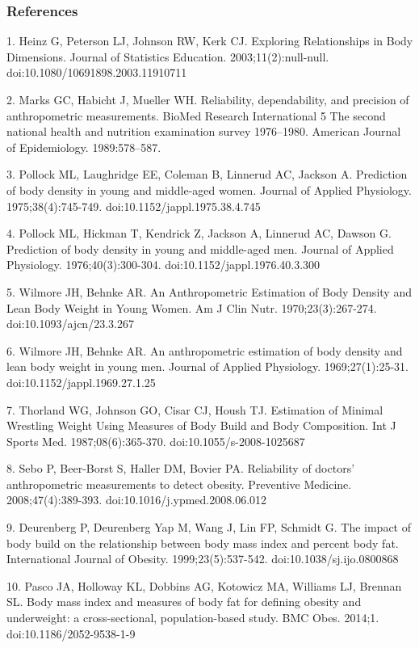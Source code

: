 \documentclass{beamer}
\begin{document}
\begingroup
\small
\begin{frame}
\frametitle{References}
1. Heinz G, Peterson LJ, Johnson RW, Kerk CJ. Exploring Relationships in Body Dimensions. Journal of Statistics Education. 2003;11(2):null-null. doi:10.1080/10691898.2003.11910711  

2. Marks GC, Habicht J, Mueller WH. Reliability, dependability, and precision of anthropometric measurements. BioMed Research International 5 The second national health and nutrition examination survey 1976–1980. American Journal of Epidemiology. 1989:578–587.  

3. Pollock ML, Laughridge EE, Coleman B, Linnerud AC, Jackson A. Prediction of body density in young and middle-aged women. Journal of Applied Physiology. 1975;38(4):745-749. doi:10.1152/jappl.1975.38.4.745  

4. Pollock ML, Hickman T, Kendrick Z, Jackson A, Linnerud AC, Dawson G. Prediction of body density in young and middle-aged men. Journal of Applied Physiology. 1976;40(3):300-304. doi:10.1152/jappl.1976.40.3.300  

5. Wilmore JH, Behnke AR. An Anthropometric Estimation of Body Density and Lean Body Weight in Young Women. Am J Clin Nutr. 1970;23(3):267-274. doi:10.1093/ajcn/23.3.267  
\end{frame}


\begin{frame}
6. Wilmore JH, Behnke AR. An anthropometric estimation of body density and lean body weight in young men. Journal of Applied Physiology. 1969;27(1):25-31. doi:10.1152/jappl.1969.27.1.25  

7. Thorland WG, Johnson GO, Cisar CJ, Housh TJ. Estimation of Minimal Wrestling Weight Using Measures of Body Build and Body Composition. Int J Sports Med. 1987;08(6):365-370. doi:10.1055/s-2008-1025687  

8. Sebo P, Beer-Borst S, Haller DM, Bovier PA. Reliability of doctors’ anthropometric measurements to detect obesity. Preventive Medicine. 2008;47(4):389-393. doi:10.1016/j.ypmed.2008.06.012  

9. Deurenberg P, Deurenberg Yap M, Wang J, Lin FP, Schmidt G. The impact of body build on the relationship between body mass index and percent body fat. International Journal of Obesity. 1999;23(5):537-542. doi:10.1038/sj.ijo.0800868  

10. Pasco JA, Holloway KL, Dobbins AG, Kotowicz MA, Williams LJ, Brennan SL. Body mass index and measures of body fat for defining obesity and underweight: a cross-sectional, population-based study. BMC Obes. 2014;1. doi:10.1186/2052-9538-1-9  

\end{frame}
\end{document}
